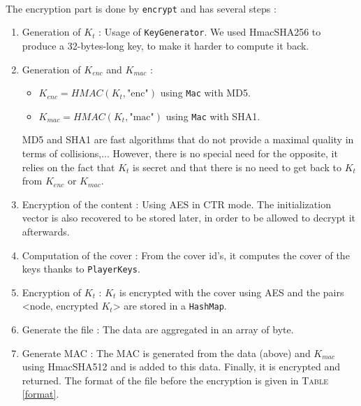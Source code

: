 \documentclass[a4paper,titlepage]{article}
\begin{document}
\paragraph{}
The encryption part is done by \texttt{encrypt} and has several steps : 
\begin{enumerate}
	\item Generation of $K_t$ : Usage of \texttt{KeyGenerator}. We used HmacSHA256 to produce a 32-bytes-long key, to make it harder to compute it back.
	
	\item Generation of $K_{enc}$ and $K_{mac}$ : 
	\begin{itemize}	
		\item $K_{enc} = HMAC(K_t, \text{"enc"})$ using \texttt{Mac} with MD5. 
		\item $K_{mac} = HMAC(K_t, \text{"mac"})$ using \texttt{Mac} with SHA1. 
	\end{itemize}
	MD5 and SHA1 are fast algorithms that do not provide a maximal quality in terms of collisions,... However, there is no special need for the opposite, it relies on the fact that $K_t$ is secret and that there is no need to get back to $K_t$ from $K_{enc}$ or $K_{mac}$.
	
	\item Encryption of the content : Using AES in CTR mode. The initialization vector is also recovered to be stored later, in order to be allowed to decrypt it afterwards. 
	
	\item Computation of the cover : From the cover id's, it computes the cover of the keys thanks to \texttt{PlayerKeys}.

	\item Encryption of $K_t$ : $K_t$ is encrypted with the cover using AES and the pairs <node, encrypted $K_t$> are stored in a \texttt{HashMap}.

	\item Generate the file : The data are aggregated in an array of byte.

	\item Generate MAC : The MAC is generated from the data (above) and $K_{mac}$ using HmacSHA512 and is added to this data. Finally, it is encrypted and returned. The format of the file before the encryption is given in \textsc{Table} \ref{format}.
\end{enumerate}
\end{document}
